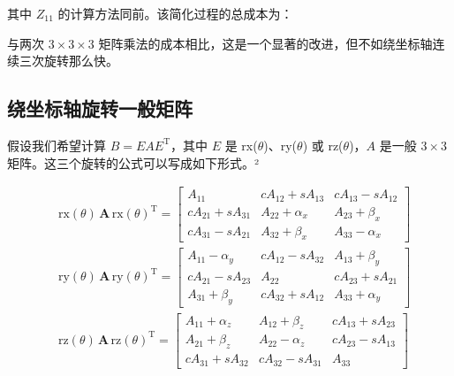 \documentclass[10pt,a4paper]{book}
\theoremstyle{thmstyle} %
\theoremstyle{defstyle} %
\theoremstyle{prostyle} %
\begin{document}
其中 $Z_{11}$ 的计算方法同前。该简化过程的总成本为：





与两次 $3 \times 3 \times 3$ 矩阵乘法的成本相比，这是一个显著的改进，但不如绕坐标轴连续三次旋转那么快。



\subsection{绕坐标轴旋转一般矩阵}





假设我们希望计算 $B = EAE^{\mathrm{T}}$，其中 $E$ 是 rx($\theta$)、ry($\theta$) 或 rz($\theta$)，$A$ 是一般 $3 \times 3$ 矩阵。这三个旋转的公式可以写成如下形式。²



$$
\begin{array}{rl} & { \mathrm { r x } ( \theta ) \, \mathbf { A } \, \mathrm { r x } ( \theta ) ^{\mathrm { T} } = \left[ \begin{array}{lll} { A _ { 11 } } & { c A _ { 12 } + s A _ { 13 } } & { c A _ { 13 } - s A _ { 12 } } \\{ c A _ { 21 } + s A _ { 31 } } & { A _ { 22 } + \alpha _ { x } } & { A _ { 23 } + \beta _ { x } } \\{ c A _ { 31 } - s A _ { 21 } } & { A _ { 32 } + \beta _ { x } } & { A _ { 33 } - \alpha _ { x } } \end{array} \right] } \\& { \mathrm { r y } ( \theta ) \, \mathbf { A } \, \mathrm { r y } ( \theta ) ^{\mathrm { T} } = \left[ \begin{array}{lll} { A _ { 11 } - \alpha _ { y } } & { c A _ { 12 } - s A _ { 32 } } & { A _ { 13 } + \beta _ { y } } \\{ c A _ { 21 } - s A _ { 23 } } & { A _ { 22 } } & { c A _ { 23 } + s A _ { 21 } } \\{ A _ { 31 } + \beta _ { y } } & { c A _ { 32 } + s A _ { 12 } } & { A _ { 33 } + \alpha _ { y } } \end{array} \right] } \\& { \mathrm { r z } ( \theta ) \, \mathbf { A } \, \mathrm { r z } ( \theta ) ^{\mathrm { T} } = \left[ \begin{array}{lll} { A _ { 11 } + \alpha _ { z } } & { A _ { 12 } + \beta _ { z } } & { c A _ { 13 } + s A _ { 23 } } \\{ A _ { 21 } + \beta _ { z } } & { A _ { 22 } - \alpha _ { z } } & { c A _ { 23 } - s A _ { 13 } } \\{ c A _ { 31 } + s A _ { 32 } } & { c A _ { 32 } - s A _ { 31 } } & { A _ { 33 } } \end{array} \right] } \end{array}
$$
\end{document}
